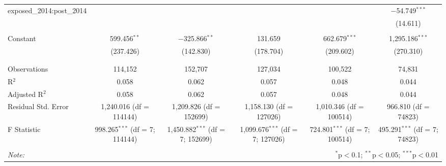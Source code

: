 \begin{table}[!htbp]
\begin{adjustbox}{width=\textwidth}
\begin{tabular}{@{\extracolsep{5pt}}lccccc}
 exposed\_2014:post\_2014 &  &  &  &  & $-$54.749$^{***}$ \\ 
  &  &  &  &  & (14.611) \\ 
  & & & & & \\ 
 Constant & 599.456$^{**}$ & $-$325.866$^{**}$ & 131.659 & 662.679$^{***}$ & 1,295.186$^{***}$ \\ 
  & (237.426) & (142.830) & (178.704) & (209.602) & (270.310) \\ 
  & & & & & \\ 
\hline \\[-1.8ex] 
Observations & 114,152 & 152,707 & 127,034 & 100,522 & 74,831 \\ 
R$^{2}$ & 0.058 & 0.062 & 0.057 & 0.048 & 0.044 \\ 
Adjusted R$^{2}$ & 0.058 & 0.062 & 0.057 & 0.048 & 0.044 \\ 
Residual Std. Error & 1,240.016 (df = 114144) & 1,209.826 (df = 152699) & 1,158.130 (df = 127026) & 1,010.346 (df = 100514) & 966.810 (df = 74823) \\ 
F Statistic & 998.265$^{***}$ (df = 7; 114144) & 1,450.882$^{***}$ (df = 7; 152699) & 1,099.676$^{***}$ (df = 7; 127026) & 724.801$^{***}$ (df = 7; 100514) & 495.291$^{***}$ (df = 7; 74823) \\ 
\hline 
\hline \\[-1.8ex] 
\textit{Note:}  & \multicolumn{5}{r}{$^{*}$p$<$0.1; $^{**}$p$<$0.05; $^{***}$p$<$0.01} \\ 
\end{tabular} 
\end{adjustbox}
\end{table} 
